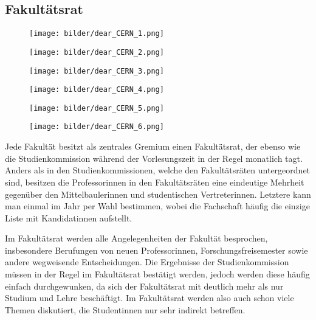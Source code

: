 \vspace{-3mm}

\subsection{Fakultätsrat}

\begin{figure*}[b]
    \centering
    \begin{subfigure}{.3\textwidth}
        \texttt{[image: bilder/dear\_CERN\_1.png]}
        \vspace{7mm}
    \end{subfigure}
    \begin{subfigure}{.3\textwidth}
        \texttt{[image: bilder/dear\_CERN\_2.png]}
        \vspace{7mm}
    \end{subfigure}
    \begin{subfigure}{.3\textwidth}
        \texttt{[image: bilder/dear\_CERN\_3.png]}
        \vspace{7mm}
    \end{subfigure}
    \begin{subfigure}{.3\textwidth}
        \texttt{[image: bilder/dear\_CERN\_4.png]}
    \end{subfigure}
    \begin{subfigure}{.3\textwidth}
        \texttt{[image: bilder/dear\_CERN\_5.png]}
    \end{subfigure}
    \begin{subfigure}{.3\textwidth}
        \texttt{[image: bilder/dear\_CERN\_6.png]}
    \end{subfigure}
\end{figure*}

Jede Fakultät besitzt als zentrales Gremium einen Fakultätsrat, der ebenso wie die Studienkommission während der Vorlesungszeit in der Regel monatlich tagt. Anders als in den Studienkommissionen, welche den Fakultätsräten untergeordnet sind, besitzen die Professorinnen in den Fakultätsräten eine eindeutige Mehrheit gegenüber den Mittelbaulerinnen und studentischen Vertreterinnen. Letztere kann man einmal im Jahr per Wahl bestimmen, wobei die Fachschaft häufig die einzige Liste mit Kandidatinnen aufstellt.

Im Fakultätsrat werden alle Angelegenheiten der Fakultät besprochen, insbesondere Berufungen von neuen Professorinnen, Forschungsfreisemester sowie andere wegweisende Entscheidungen. Die Ergebnisse der Studienkommission müssen in der Regel im Fakultätsrat bestätigt werden, jedoch werden diese häufig einfach durchgewunken, da sich der Fakultätsrat mit deutlich mehr als nur Studium und Lehre beschäftigt. Im Fakultätsrat werden also auch schon viele Themen diskutiert, die Studentinnen nur sehr indirekt betreffen.

